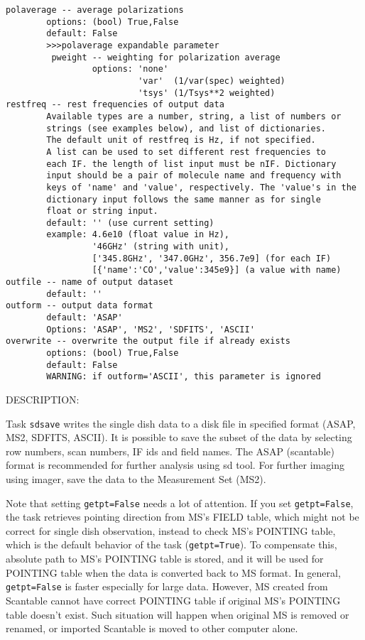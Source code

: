 \begin{verbatim}
polaverage -- average polarizations
        options: (bool) True,False
        default: False
        >>>polaverage expandable parameter
         pweight -- weighting for polarization average
                 options: 'none'
                          'var'  (1/var(spec) weighted)
                          'tsys' (1/Tsys**2 weighted)
restfreq -- rest frequencies of output data
        Available types are a number, string, a list of numbers or
        strings (see examples below), and list of dictionaries. 
        The default unit of restfreq is Hz, if not specified.
        A list can be used to set different rest frequencies to
        each IF. the length of list input must be nIF. Dictionary 
        input should be a pair of molecule name and frequency with 
        keys of 'name' and 'value', respectively. The 'value's in the 
        dictionary input follows the same manner as for single 
        float or string input. 
        default: '' (use current setting)
        example: 4.6e10 (float value in Hz),
                 '46GHz' (string with unit),
                 ['345.8GHz', '347.0GHz', 356.7e9] (for each IF)
                 [{'name':'CO','value':345e9}] (a value with name)
outfile -- name of output dataset
        default: '' 
outform -- output data format
        default: 'ASAP'
        Options: 'ASAP', 'MS2', 'SDFITS', 'ASCII'
overwrite -- overwrite the output file if already exists
        options: (bool) True,False
        default: False
        WARNING: if outform='ASCII', this parameter is ignored
\end{verbatim}

DESCRIPTION:

Task {\tt sdsave} writes the single dish data to a disk file in 
specified format (ASAP, MS2, SDFITS, ASCII). It is possible to
save the subset of the data by selecting row numbers, scan numbers, IF ids
and field names. The ASAP (scantable) format is recommended for
further analysis using sd tool. For further imaging using imager,
save the data to the Measurement Set (MS2).
          
Note that setting {\tt getpt=False} needs a lot of attention.
If you set {\tt getpt=False}, the task retrieves pointing direction from 
MS's FIELD table, which might not be correct for single dish 
observation, instead to check MS's POINTING table, which is the 
default behavior of the task ({\tt getpt=True}). To compensate this, 
absolute path to MS's POINTING table is stored, and it will be used 
for POINTING table when the data is converted back to MS format. 
In general, {\tt getpt=False} is faster especially for large data. However, 
MS created from Scantable cannot have correct POINTING table if 
original MS's POINTING table doesn't exist. Such situation will 
happen when original MS is removed or renamed, or imported Scantable 
is moved to other computer alone.

